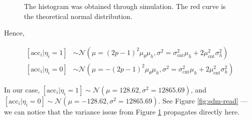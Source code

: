 \begin{figure}[h!]
  \centering


  \caption{The histogram was obtained through simulation. The red curve is the theoretical normal distribution.}
  \label{fig:sdm-read-sums}
\end{figure}

Hence,

\begin{align}
\left[ \text{acc}_i|\eta_i=1 \right] &\sim \mathcal{N}(\mu = (2p-1)^2 \mu_\theta \mu_h, \sigma^2 = \sigma_\text{cnt}^2 \mu_h + 2 \mu_\text{cnt}^2 \sigma^2_h) \label{eqn:sdm-eta1} \\
\left[ \text{acc}_i|\eta_i=0 \right] &\sim \mathcal{N}(\mu = -(2p-1)^2 \mu_\theta \mu_h, \sigma^2 = \sigma_\text{cnt}^2 \mu_h + 2 \mu_\text{cnt}^2 \sigma^2_h) \label{eqn:sdm-eta0}
\end{align}

In our case, $\left[ \text{acc}_i|\eta_i=1 \right] \sim \mathcal{N}(\mu = 128.62, \sigma^2 = 12865.69)$, and $\left[ \text{acc}_i|\eta_i=0 \right] \sim \mathcal{N}(\mu = -128.62, \sigma^2 = 12865.69)$. See Figure \ref{fig:sdm-read} --- we can notice that the variance issue from Figure \ref{fig:sdm-read-sums} propagates directly here.

